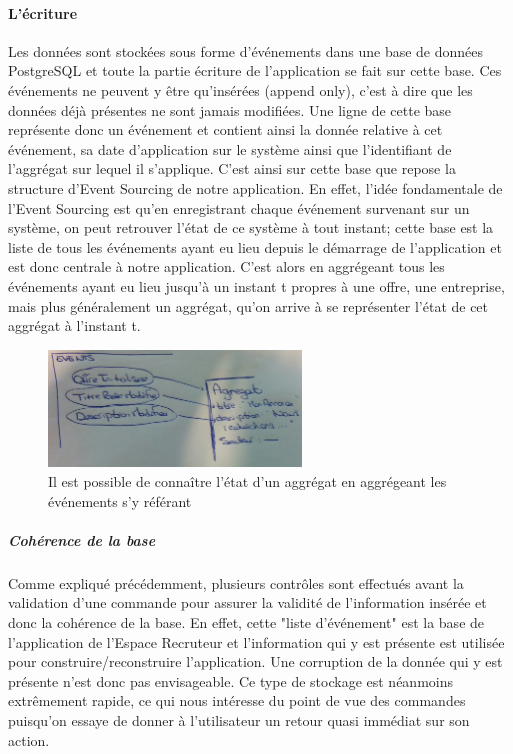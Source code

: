 \paragraph{L'écriture}
\label{par:L'écriture}
Les données sont stockées sous forme d'événements dans une base de données PostgreSQL et toute la partie écriture de l'application se fait sur cette base.
Ces événements ne peuvent y être qu'insérées (append only), c'est à dire que les données déjà présentes ne sont jamais modifiées.
Une ligne de cette base représente donc un événement et contient ainsi la donnée relative à cet événement, sa date d'application sur le système ainsi que l'identifiant de l'aggrégat sur lequel il s'applique.
C'est ainsi sur cette base que repose la structure d'Event Sourcing de notre application.
En effet, l'idée fondamentale de l'Event Sourcing est qu'en enregistrant chaque événement survenant sur un système, on peut retrouver l'état de ce système à tout instant; cette base est la liste de tous les événements ayant eu lieu depuis le démarrage de l'application et est donc centrale à notre application.
C'est alors en aggrégeant tous les événements ayant eu lieu jusqu'à un instant t propres à une offre, une entreprise, mais plus généralement un aggrégat, qu'on arrive à se représenter l'état de cet aggrégat à l'instant t.
\begin{figure}[h]
  \begin{center}
    \includegraphics[width=0.6\textwidth]{Pictures/EventSourcing/events.png}
    \caption{Il est possible de connaître l'état d'un aggrégat en aggrégeant les événements s'y référant}
  \end{center}
\end{figure}
\subparagraph{Cohérence de la base}
Comme expliqué précédemment, plusieurs contrôles sont effectués avant la validation d'une commande pour assurer la validité de l'information insérée et donc la cohérence de la base.
En effet, cette "liste d'événement" est la base de l'application de l'Espace Recruteur et l'information qui y est présente est utilisée pour construire/reconstruire l'application.
Une corruption de la donnée qui y est présente n'est donc pas envisageable.
Ce type de stockage est néanmoins extrêmement rapide, ce qui nous intéresse du point de vue des commandes puisqu'on essaye de donner à l'utilisateur un retour quasi immédiat sur son action.

